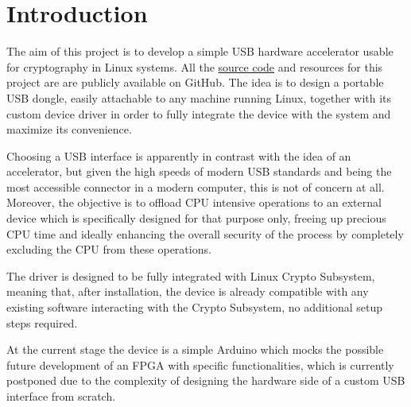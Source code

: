 \section{Introduction}
The aim of this project is to develop a simple USB hardware accelerator usable for cryptography in Linux systems. All the \href{https://github.com/levnikolaevicmiskyn/cryptIC}{source code} and resources for this project are are publicly available on GitHub. The idea is to design a portable USB dongle, easily attachable to any machine running Linux, together with its custom device driver in order to fully integrate the device with the system and maximize its convenience.

Choosing a USB interface is apparently in contrast with the idea of an accelerator, but given the high speeds of modern USB standards and being the most accessible connector in a modern computer, this is not of concern at all. Moreover, the objective is to offload CPU intensive operations to an external device which is specifically designed for that purpose only, freeing up precious CPU time and ideally enhancing the overall security of the process by completely excluding the CPU from these operations.

The driver is designed to be fully integrated with Linux Crypto Subsystem, meaning that, after installation, the device is already compatible with any existing software interacting with the Crypto Subsystem, no additional setup steps required.

At the current stage the device is a simple Arduino which mocks the possible future development of an FPGA with specific functionalities, which is currently postponed due to the complexity of designing the hardware side of a custom USB interface from scratch.
